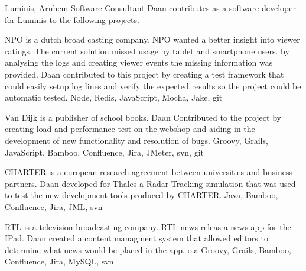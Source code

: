 	\begin{workExperience}{Luminis, Arnhem}%
	{Software Consultant}{}	
                Daan contributes as a software developer for Luminis
                to the following projects.
                
                NPO is a dutch broad casting company. NPO wanted a
                better insight into viewer ratings. The current
                solution missed usage by tablet and smartphone users.
                by analysing the logs and creating viewer events the
                missing information was provided.
                Daan contributed to this project by creating a test
                framework that could easily setup log lines and verify
                the expected results so the project could be automatic
                tested. 
                \technics Node, Redis, JavaScript, Mocha, Jake, git

                Van Dijk is a publisher of school books. Daan
                Contributed to the project by creating load and
                performance test on the webshop and aiding in the
                development of new functionality and resolution of bugs.
                \technics Groovy, Grails, JavaScript, Bamboo,
                Confluence, Jira, JMeter, svn, git

                CHARTER is a european research agreement between
                universities and business partners. Daan developed for
                Thales a Radar Tracking simulation that was used to
                test the new development tools produced by CHARTER.
                \technics Java, Bamboo, Confluence, Jira, JML, svn

                RTL is a television broadcasting company. RTL news
                releas a news app for the IPad. Daan created a content
                managment system that allowed editors to determine
                what news would be placed in the app.
                \technics o.a Groovy, Grails, Bamboo, Confluence,
                Jira, MySQL, svn
	\end{workExperience}

